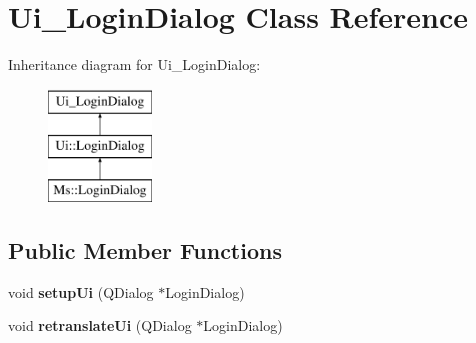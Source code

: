 \hypertarget{class_ui___login_dialog}{}\section{Ui\+\_\+\+Login\+Dialog Class Reference}
\label{class_ui___login_dialog}
Inheritance diagram for Ui\+\_\+\+Login\+Dialog\+:\begin{figure}[H]
\begin{center}
\leavevmode
\includegraphics[height=3.000000cm]{class_ui___login_dialog}
\end{center}
\end{figure}
\subsection*{Public Member Functions}
\begin{DoxyCompactItemize}
\item 
\mbox{\label{class_ui___login_dialog_a6e84935444cddd461a31d264cc42f30c}} 
void {\bfseries setup\+Ui} (Q\+Dialog $\ast$Login\+Dialog)
\item 
\mbox{\label{class_ui___login_dialog_ad2d7bb901a56825e13e265a08cab0820}} 
void {\bfseries retranslate\+Ui} (Q\+Dialog $\ast$Login\+Dialog)
\end{DoxyCompactItemize}
